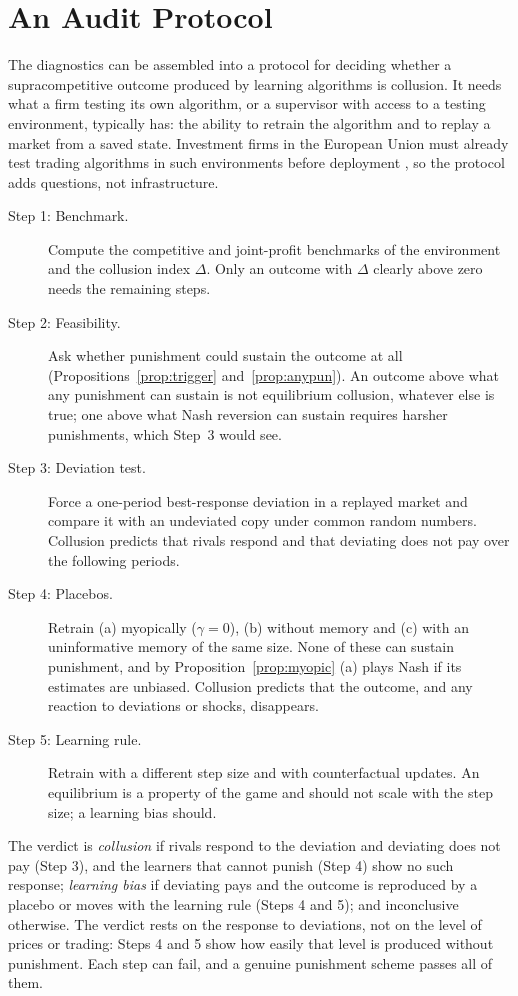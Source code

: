 \section{An Audit Protocol}
\label{sec:audit}

The diagnostics can be assembled into a protocol for deciding whether a
supracompetitive outcome produced by learning algorithms is collusion. It
needs what a firm testing its own algorithm, or a supervisor with access to
a testing environment, typically has: the ability to retrain the algorithm
and to replay a market from a saved state. Investment firms in the European
Union must already test trading algorithms in such environments before
deployment \citep{rts6}, so the protocol adds questions, not infrastructure.

\begin{description}
\item[Step 1: Benchmark.] Compute the competitive and joint-profit
  benchmarks of the environment and the collusion index $\Delta$. Only an
  outcome with $\Delta$ clearly above zero needs the remaining steps.
\item[Step 2: Feasibility.] Ask whether punishment could sustain the outcome
  at all (Propositions~\ref{prop:trigger} and~\ref{prop:anypun}). An outcome
  above what any punishment can sustain is not equilibrium collusion,
  whatever else is true; one above what Nash reversion can sustain requires
  harsher punishments, which Step~3 would see.
\item[Step 3: Deviation test.] Force a one-period best-response deviation in a
  replayed market and compare it with an undeviated copy under common random
  numbers. Collusion predicts that rivals respond and that deviating does not
  pay over the following periods.
\item[Step 4: Placebos.] Retrain (a) myopically ($\gamma=0$), (b) without
  memory and (c) with an uninformative memory of the same size. None of
  these can sustain punishment, and by Proposition~\ref{prop:myopic} (a)
  plays Nash if its estimates are unbiased. Collusion predicts that the
  outcome, and any reaction to deviations or shocks, disappears.
\item[Step 5: Learning rule.] Retrain with a different step size and with
  counterfactual updates. An equilibrium is a property of the game and should
  not scale with the step size; a learning bias should.
\end{description}

\noindent The verdict is \emph{collusion} if rivals respond to the deviation
and deviating does not pay (Step 3), and the learners that cannot punish
(Step 4) show no such response; \emph{learning bias} if deviating pays and
the outcome is reproduced by a placebo or moves with the learning rule
(Steps 4 and 5); and inconclusive otherwise. The verdict rests on the
response to deviations, not on the level of prices or trading: Steps 4 and 5
show how easily that level is produced without punishment. Each step can
fail, and a genuine punishment scheme passes all of them.

